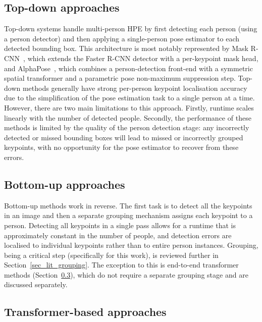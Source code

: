 \subsection{Top-down approaches}
\label{sec_lit_hpe_topdown}

Top-down systems handle multi-person HPE by
first detecting each person (using a person detector)
and then applying a single-person pose estimator to each detected bounding box.
This architecture is most notably represented by Mask R-CNN~\cite{he2017maskrcnn},
which extends the Faster R-CNN detector with a per-keypoint mask head,
and AlphaPose~\cite{fang2017rmpe},
which combines a person-detection front-end with a symmetric spatial transformer
and a parametric pose non-maximum suppression step.
Top-down methods generally have strong per-person keypoint localisation accuracy
due to the simplification of the pose estimation task to a single person at a time.
However, there are two main limitations to this approach.
Firstly, runtime scales linearly with the number of detected people.
Secondly, the performance of these methods is limited by the quality of the person detection stage:
any incorrectly detected or missed bounding boxes will lead to missed or incorrectly grouped keypoints,
with no opportunity for the pose estimator to recover from these errors.

\subsection{Bottom-up approaches}
\label{sec_lit_hpe_bottomup}

Bottom-up methods work in reverse.
The first task is to detect all the keypoints in an image
and then a separate grouping mechanism assigns each keypoint to a person.
Detecting all keypoints in a single pass allows for a runtime that is approximately constant in the number of people,
and detection errors are localised to individual keypoints rather than to entire person instances.
Grouping, being a critical step (specifically for this work), is reviewed further in Section~\ref{sec_lit_grouping}.
The exception to this is end-to-end transformer methods (Section~\ref{sec_lit_hpe_transformer}),
which do not require a separate grouping stage and are discussed separately.

\subsection{Transformer-based approaches}
\label{sec_lit_hpe_transformer}

